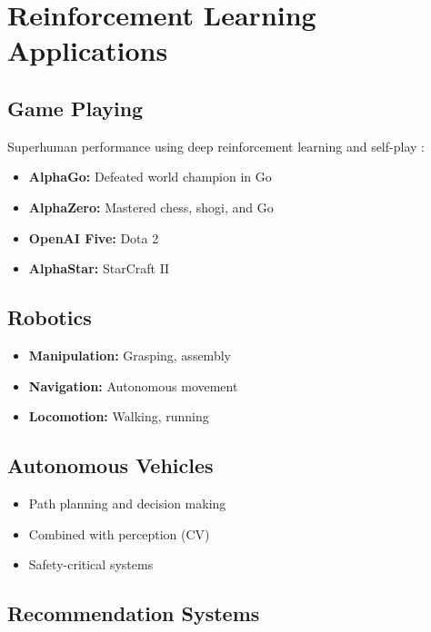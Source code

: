 
\section{Reinforcement Learning Applications}
\label{sec:rl-applications}

\subsection{Game Playing}

Superhuman performance using deep reinforcement learning and self-play \textcite{Silver2016,Prince2023}:
\begin{itemize}
    \item \textbf{AlphaGo:} Defeated world champion in Go
    \item \textbf{AlphaZero:} Mastered chess, shogi, and Go
    \item \textbf{OpenAI Five:} Dota 2
    \item \textbf{AlphaStar:} StarCraft II
\end{itemize}

\subsection{Robotics}

\begin{itemize}
    \item \textbf{Manipulation:} Grasping, assembly
    \item \textbf{Navigation:} Autonomous movement
    \item \textbf{Locomotion:} Walking, running
\end{itemize}

\subsection{Autonomous Vehicles}

\begin{itemize}
    \item Path planning and decision making
    \item Combined with perception (CV)
    \item Safety-critical systems
\end{itemize}

\subsection{Recommendation Systems}

